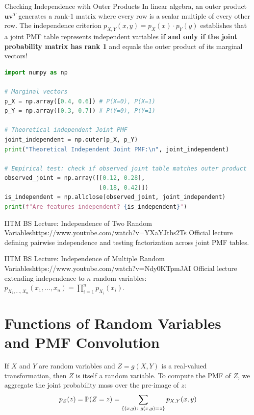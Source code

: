 \begin{intuitionbox}{Checking Independence with Outer Products}
In linear algebra, an outer product $\mathbf{u} \mathbf{v}^T$ generates a rank-1 matrix where every row is a scalar multiple of every other row. The independence criterion $p_{X,Y}(x, y) = p_X(x) \cdot p_Y(y)$ establishes that a joint PMF table represents independent variables \textbf{if and only if the joint probability matrix has rank 1} and equals the outer product of its marginal vectors!
\end{intuitionbox}

\begin{lstlisting}[language=Python, caption=Data Science: Verifying Independence via Outer Product in NumPy]
import numpy as np

# Marginal vectors
p_X = np.array([0.4, 0.6]) # P(X=0), P(X=1)
p_Y = np.array([0.3, 0.7]) # P(Y=0), P(Y=1)

# Theoretical independent Joint PMF
joint_independent = np.outer(p_X, p_Y)
print("Theoretical Independent Joint PMF:\n", joint_independent)

# Empirical test: check if observed joint table matches outer product
observed_joint = np.array([[0.12, 0.28],
                           [0.18, 0.42]])
is_independent = np.allclose(observed_joint, joint_independent)
print(f"Are features independent? {is_independent}")
\end{lstlisting}

\begin{videocard}{IITM BS Lecture: Independence of Two Random Variables}{https://www.youtube.com/watch?v=YXaYJths2Ts}
Official lecture defining pairwise independence and testing factorization across joint PMF tables.
\end{videocard}

\begin{videocard}{IITM BS Lecture: Independence of Multiple Random Variables}{https://www.youtube.com/watch?v=Ndy0KTpmJAI}
Official lecture extending independence to $n$ random variables: $p_{X_1,\dots,X_n}(x_1,\dots,x_n) = \prod_{i=1}^n p_{X_i}(x_i)$.
\end{videocard}

\section{Functions of Random Variables and PMF Convolution}

If $X$ and $Y$ are random variables and $Z = g(X, Y)$ is a real-valued transformation, then $Z$ is itself a random variable. To compute the PMF of $Z$, we aggregate the joint probability mass over the pre-image of $z$:
$$p_Z(z) = \P(Z = z) = \sum_{\{(x, y) \colon g(x, y) = z\}} p_{X,Y}(x, y)$$

